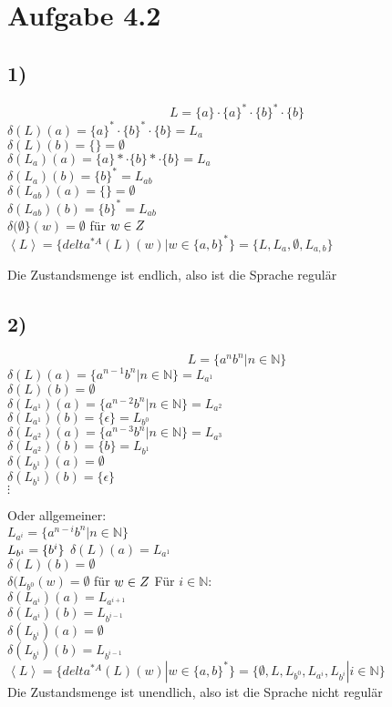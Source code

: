 \section*{Aufgabe 4.2}
\subsection*{1)}
\[L=\{a\}\cdot\{a\}^*\cdot\{b\}^*\cdot\{b\}\]
$\delta(L)(a)=\{a\}^*\cdot\{b\}^*\cdot\{b\}=L_a$\\
$\delta(L)(b)=\{\}=\emptyset$\\
$\delta(L_a)(a)=\{a\}*\cdot\{b\}*\cdot\{b\}=L_a$\\
$\delta(L_a)(b)=\{b\}^*=L_{ab}$\\
$\delta(L_{ab})(a)=\{\}=\emptyset$\\
$\delta(L_{ab})(b)=\{b\}^*=L_{ab}$\\
$\delta(\emptyset\}(w)=\emptyset$ für $w\in Z\\$
$\left<L\right>=\{delta^{*A}(L)(w)|w\in \{a,b\}^*\}=\{L, L_a, \emptyset, L_{a,b}\}$

Die Zustandsmenge ist endlich, also ist die Sprache regulär

\subsection*{2)}
\[L=\{a^nb^n | n\in\mathbb{N}\}\]
$\delta(L)(a)=\{a^{n-1}b^n|n\in \mathbb{N}\}=L_{a^1}$\\
$\delta(L)(b)=\emptyset$\\
$\delta(L_{a^1})(a)=\{a^{n-2}b^n|n \in\mathbb{N}\}=L_{a^2}$\\
$\delta(L_{a^1})(b)=\{\epsilon\}=L_{b^0}$\\
$\delta(L_{a^2})(a)=\{a^{n-3}b^n|n\in\mathbb{N}\}=L_{a^3}$\\
$\delta(L_{a^2})(b)=\{b\}=L_{b^1}$\\
$\delta(L_{b^1})(a)=\emptyset$\\
$\delta(L_{b^1})(b)=\{\epsilon\}$\\
$\vdots$

Oder allgemeiner:\\
$L_{a^i}=\{a^{n-i}b^n|n\in\mathbb{N}\}$\\
$L_{b^i}=\{b^i\}\\$
$\delta(L)(a)=L_{a^1}$\\
$\delta(L)(b)=\emptyset$\\
$\delta(L_{b^0}(w)=\emptyset$ für $w\in Z\\$
Für $i\in\mathbb{N}$:\\
$\delta(L_{a^i})(a)=L_{a^{i+1}}$\\
$\delta(L_{a^i})(b)=L_{b^{i-1}}$\\
$\delta(L_{b^i})(a)=\emptyset$\\
$\delta(L_{b^i})(b)=L_{b^{i-1}}$\\
$\left<L\right>=\{delta^{*A}(L)(w)|w\in \{a,b\}^*\}=\{\emptyset, L, L_{b^0}, L_{a^i}, L_{b^i} | i \in \mathbb{N} \}$\\

Die Zustandsmenge ist unendlich, also ist die Sprache nicht regulär
